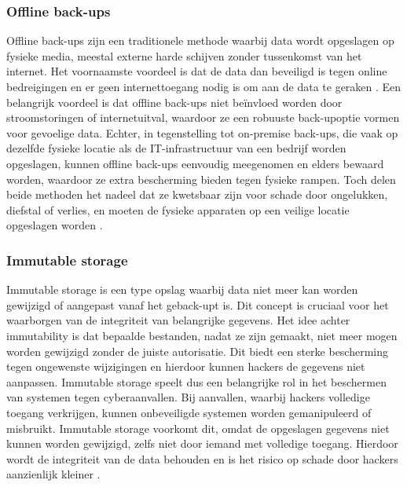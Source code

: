 \subsubsection{Offline back-ups}
Offline back-ups zijn een traditionele methode waarbij data wordt opgeslagen op fysieke media, meestal externe harde schijven zonder tussenkomst van het internet. Het voornaamste voordeel is dat de data dan beveiligd is tegen online bedreigingen en er geen internettoegang nodig is om aan de data te geraken  \autocite{Edwards2022}. Een belangrijk voordeel is dat offline back-ups niet beïnvloed worden door stroomstoringen of internetuitval, waardoor ze een robuuste back-upoptie vormen voor gevoelige data. Echter, in tegenstelling tot on-premise back-ups, die vaak op dezelfde fysieke locatie als de IT-infrastructuur van een bedrijf worden opgeslagen, kunnen offline back-ups eenvoudig meegenomen en elders bewaard worden, waardoor ze extra bescherming bieden tegen fysieke rampen. Toch delen beide methoden het nadeel dat ze kwetsbaar zijn voor schade door ongelukken, diefstal of verlies, en moeten de fysieke apparaten op een veilige locatie opgeslagen worden \autocite{James2019}.

\subsubsection{Immutable storage}
Immutable storage is een type opslag waarbij data niet meer kan worden gewijzigd of aangepast vanaf het geback-upt is. Dit concept is cruciaal voor het waarborgen van de integriteit van belangrijke gegevens. Het idee achter immutability is dat bepaalde bestanden, nadat ze zijn gemaakt, niet meer mogen worden gewijzigd zonder de juiste autorisatie. Dit biedt een sterke bescherming tegen ongewenste wijzigingen en hierdoor kunnen hackers de gegevens niet aanpassen. Immutable storage speelt dus een belangrijke rol in het beschermen van systemen tegen cyberaanvallen. Bij aanvallen, waarbij hackers volledige toegang verkrijgen, kunnen onbeveiligde systemen worden gemanipuleerd of misbruikt. Immutable storage voorkomt dit, omdat de opgeslagen gegevens niet kunnen worden gewijzigd, zelfs niet door iemand met volledige toegang. Hierdoor wordt de integriteit van de data behouden en is het risico op schade door hackers aanzienlijk kleiner \autocite{Hasan2005}.

